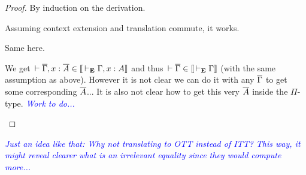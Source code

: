 \documentclass{amsart}
\newcommand\meta[1]{\noindent\textcolor{blue}{\emph{#1}}}
\begin{document}
\begin{proof}
  By induction on the derivation.
  \begin{caselist}
    \nextcase
    \begin{mathc}
    \end{mathc}
    Assuming context extension and translation commute, it works.

    \nextcase
    \begin{mathc}
    \end{mathc}
    Same here.

    \nextcase
    \begin{mathc}
    \end{mathc}
    We get $\,\vdash \overline{\Gamma}, x : \overline{A} \in \mathopen{{[\kern-0.14em[}} \,\vdash_\mathbf{E} \Gamma, x:A \mathclose{{]\kern-0.14em]}}$ and thus
    $\,\vdash \overline{\Gamma} \in \mathopen{{[\kern-0.14em[}} \,\vdash_\mathbf{E} \Gamma \mathclose{{]\kern-0.14em]}}$ (with the same assumption as above).
    However it is not clear we can do it with any $\overline{\Gamma}$ to get some
    corresponding $\overline{A}$... It is also not clear how to get this very
    $\overline{A}$ inside the $\Pi$-type.
    \meta{Work to do...}
  \end{caselist}
\end{proof}

\meta{Just an idea like that: Why not translating to OTT instead of ITT? This
way, it might reveal clearer what is an irrelevant equality since they would
compute more...}
\end{document}
